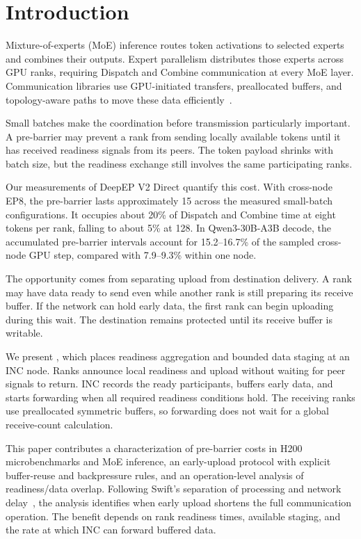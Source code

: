 \section{Introduction}
\label{sec:intro}
Mixture-of-experts (MoE) inference routes token activations to selected experts and combines their outputs. Expert parallelism distributes those experts across GPU ranks, requiring Dispatch and Combine communication at every MoE layer. Communication libraries use GPU-initiated transfers, preallocated buffers, and topology-aware paths to move these data efficiently~\cite{deepep,ncclep}.

Small batches make the coordination before transmission particularly important. A pre-barrier may prevent a rank from sending locally available tokens until it has received readiness signals from its peers. The token payload shrinks with batch size, but the readiness exchange still involves the same participating ranks.

Our measurements of DeepEP V2 Direct quantify this cost. With cross-node EP8, the pre-barrier lasts approximately 15\us{} across the measured small-batch configurations. It occupies about 20\% of Dispatch and Combine time at eight tokens per rank, falling to about 5\% at 128. In Qwen3-30B-A3B decode, the accumulated pre-barrier intervals account for 15.2--16.7\% of the sampled cross-node GPU step, compared with 7.9--9.3\% within one node.

The opportunity comes from separating upload from destination delivery. A rank may have data ready to send even while another rank is still preparing its receive buffer. If the network can hold early data, the first rank can begin uploading during this wait. The destination remains protected until its receive buffer is writable.

We present \sys{}, which places readiness aggregation and bounded data staging at an INC node. Ranks announce local readiness and upload without waiting for peer signals to return. INC records the ready participants, buffers early data, and starts forwarding when all required readiness conditions hold. The receiving ranks use preallocated symmetric buffers, so forwarding does not wait for a global receive-count calculation.

This paper contributes a characterization of pre-barrier costs in H200 microbenchmarks and MoE inference, an early-upload protocol with explicit buffer-reuse and backpressure rules, and an operation-level analysis of readiness/data overlap. Following Swift's separation of processing and network delay~\cite{swift}, the analysis identifies when early upload shortens the full communication operation. The benefit depends on rank readiness times, available staging, and the rate at which INC can forward buffered data.

